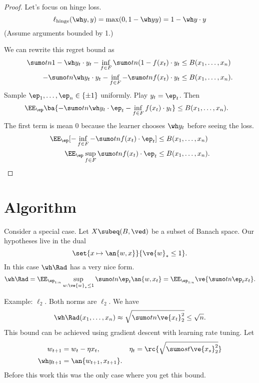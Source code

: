 \begin{proof}
Let's focus on hinge loss. 
$$
\ell_{\text{hinge}}(\wh y, y) = \max(0,1-\wh yy) = 1-\wh y\cdot y
$$
(Assume arguments bounded by 1.)

We can rewrite this regret bound as
\begin{align}
\sumo tn 1-\wh y_t\cdot y_t - \inf_{f\in F} \sumo tn (1-f(x_t)\cdot y_t
&\le B(x_1,\ldots, x_n)\\
-\sumo tn \wh y_t\cdot y_t - \inf_{f\in F} -\sumo tn f(x_t)\cdot y_t &\le B(x_1,\ldots, x_n).
\end{align}
Sample $\ep_1,\ldots, \ep_n\in \{\pm 1\}$ uniformly. Play $y_t=\ep_t$. Then 
\begin{align}
\EE_\ep \ba{-\sumo tn \wh y_t\cdot \ep_t - \inf_{f\in F} f(x_t)\cdot y_t}&\le B(x_1,\ldots, x_n).
\end{align}
The first term is mean 0 because the learner chooses $\wh y_t$ before seeing the loss.
\begin{align}
\EE_\ep [-\inf_{f\in F} -\sumo tn f(x_t)\cdot \ep_t]
&\le B(x_1,\ldots,x_n)\\
\EE_\ep \sup_{f\in F}\sumo tn f(x_t)\cdot \ep_t&\le B(x_1,\ldots, x_n).
\end{align}
\end{proof}

\section{Algorithm}
Consider a special case. 
Let $X\subeq (B, \ved)$ be a subset of Banach space.
Our hypotheses live in the dual
$$
\set{x\mapsto \an{w,x}}{\ve{w}_*\le 1}.
$$
In this case $\wh \Rad $ has a very nice form.
$$
\wh\Rad = \EE_{\ep_{1:n}} \sup_{w:\ve{w}_*\le 1} \sumo tn \ep_t\an{w,x_t} = \EE_{\ep_{1:n}} \ve{\sumo tn \ep_tx_t}.
$$

Example: $\ell_2$. Both norms are $\ell_2$. We have 
$$
\wh \Rad(x_1,\ldots, x_n) \approx \sqrt{\sumo tn \ve{x_t}_2^2}\le \sqrt n.
$$
This bound can be achieved using gradient descent with learning rate tuning. Let
\begin{align}
w_{t+1} & = w_t - \eta x_t,& \eta_t&=\rc{\sqrt{\sumo st \ve{x_s}_2^2}}\\
\wh y_{t+1} & = \an{w_{t+1},x_{t+1}}.
\end{align}
Before this work this was the only case where you get this bound.


